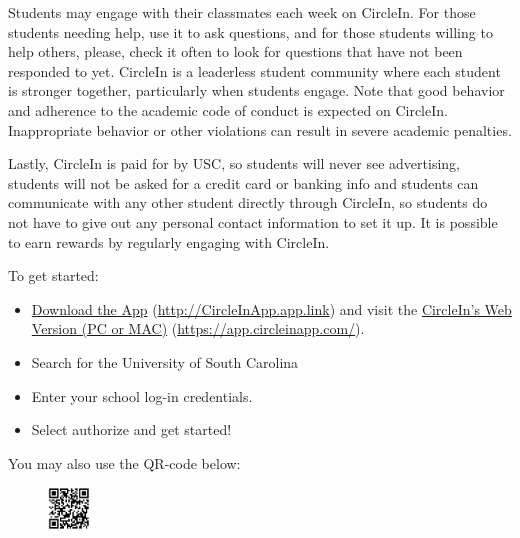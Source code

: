 \documentclass[11pt,letterpaper]{article}
\begin{document}
Students may engage with their classmates each week on CircleIn. For those students needing help, use it to ask questions, and for those students willing to help others, please, check it often to look for questions that have not been responded to yet. CircleIn is a leaderless student community where each student is stronger together, particularly when students engage. Note that good behavior and adherence to the academic code of conduct is expected on CircleIn. Inappropriate behavior or other violations can result in severe academic penalties. \par\vspace{0.3cm}

Lastly, CircleIn is paid for by USC, so students will never see advertising, students will not be asked for a credit card or banking info and students can communicate with any other student directly through CircleIn, so students do not have to give out any personal contact information to set it up. It is possible to earn rewards by regularly engaging with CircleIn. \par\vspace{0.3cm}

To get started:
	\begin{itemize}
	\item \href{http://CircleInApp.app.link}{Download the App} (\url{http://CircleInApp.app.link}) and visit the \href{https://app.circleinapp.com/}{CircleIn's Web Version (PC or MAC)} (\url{https://app.circleinapp.com/}).
	\item Search for the University of South Carolina
	\item Enter your school log-in credentials. 
	\item Select authorize and get started! 
	\end{itemize}
You may also use the QR-code below:
	\begin{figure}[!ht]
	\centering
	\includegraphics[width=0.10\textwidth]{circlein_qr.png}
	\end{figure}





\newpage





\end{document}
